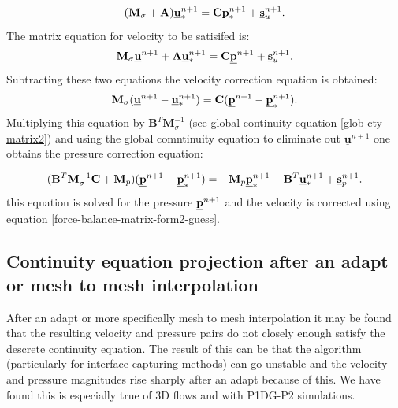 \begin{equation}
({\mathbf M}_\sigma +{\mathbf A}) \underline{\bf u}^{n+1}_* = {\mathbf C} {\bf p}^{n+1}_* + \underline{\bf s}_u^{n+1}.
\label{force-balance-matrix-form2-guess}
\end{equation}
The matrix equation for velocity to be satisifed is:
\begin{equation}
{\mathbf M}_\sigma\underline{\bf u}^{n+1} +{\mathbf A} \underline{\bf u}^{n+1}_* = {\mathbf C} \underline{\bf p}^{n+1} + \underline{\bf s}_u^{n+1}.
\label{force-balance-matrix-form2-guess-2}
\end{equation}
Subtracting these two equations the
velocity correction equation is obtained:
\begin{equation}
{\mathbf M}_\sigma ( \underline{\bf u}^{n+1} -\underline{\bf u}^{n+1}_*)
= {\mathbf C} (\underline{\bf p}^{n+1} - \underline{\bf p}^{n+1}_*).
\label{force-balance-matrix-form2-guess}
\end{equation}
Multiplying this equation by ${\mathbf B}^T {\mathbf M}_\sigma^{-1}$
(see global continuity
equation \ref{glob-cty-matrix2}) and using the global comntinuity
equation to eliminate out $ \underline{\mathbf u}^{n+1} $ one obtains
the pressure correction equation:

\begin{equation}
({\mathbf B}^T {\mathbf M}_\sigma^{-1} {\mathbf C} + {\mathbf M}_p) (\underline{\bf p}^{n+1} - \underline{\bf p}^{n+1}_*)
= - {\mathbf M}_p \underline{\bf p}^{n+1}_* - {\mathbf B}^T \underline{\bf u}^{n+1}_* + \underline{\bf s}_p^{n+1}.
\end{equation}
this equation is solved for the pressure  $\underline{\bf p}^{n+1}$ and the
velocity is corrected using equation \ref{force-balance-matrix-form2-guess}.


\subsection{Continuity equation projection after an adapt or mesh to mesh interpolation}

After an adapt or more specifically mesh to mesh interpolation it may be found that the
resulting velocity and pressure pairs do not closely enough satisfy the descrete continuity equation.
The result of this can be that the algorithm (particularly for interface capturing methods)
can go unstable and the velocity and pressure magnitudes rise sharply after an adapt because of this. We have found this is especially true of 3D flows and with P1DG-P2 simulations.

